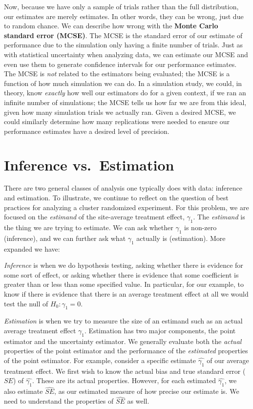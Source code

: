 \documentclass[
]{book}
\begin{document}
Now, because we have only a sample of trials rather than the full distribution, our estimates are merely estimates.
In other words, they can be wrong, just due to random chance.
We can describe how wrong with the \textbf{Monte Carlo standard error (MCSE)}.
The MCSE is the standard error of our estimate of performance due to the simulation only having a finite number of trials.
Just as with statistical uncertainty when analyzing data, we can estimate our MCSE and even use them to generate confidence intervals for our performance estimates.
The MCSE is \emph{not} related to the estimators being evaluated; the MCSE is a function of how much simulation we can do.
In a simulation study, we could, in theory, know \emph{exactly} how well our estimators do for a given context, if we ran an infinite number of simulations; the MCSE tells us how far we are from this ideal, given how many simulation trials we actually ran.
Given a desired MCSE, we could similarly determine how many replications were needed to ensure our performance estimates have a desired level of precision.

\section{Inference vs.~Estimation}\label{inference-vs.-estimation}

There are two general classes of analysis one typically does with data: inference and estimation.
To illustrate, we continue to reflect on the question of best practices for analyzing a cluster randomized experiment.
For this problem, we are focused on the \emph{estimand} of the site-average treatment effect, \(\gamma_1\).
The \emph{estimand} is the thing we are trying to estimate.
We can ask whether \(\gamma_1\) is non-zero (inference), and we can further ask what \(\gamma_1\) actually is (estimation).
More expanded we have:

\emph{Inference} is when we do hypothesis testing, asking whether there is evidence for some sort of effect, or asking whether there is evidence that some coefficient is greater than or less than some specified value.
In particular, for our example, to know if there is evidence that there is an average treatment effect at all we would test the null of \(H_0: \gamma_1 = 0\).

\emph{Estimation} is when we try to measure the size of an estimand such as an actual average treatment effect \(\gamma_1\).
Estimation has two major components, the point estimator and the uncertainty estimator.
We generally evaluate both the \emph{actual} properties of the point estimator and the performance of the \emph{estimated} properties of the point estimator.
For example, consider a specific estimate \(\hat{\gamma_1}\) of our average treatment effect.
We first wish to know the actual bias and true standard error (\(SE\)) of \(\hat{\gamma_1}\).
These are its actual properties.
However, for each estimated \(\hat{\gamma_1}\), we also estimate \(\widehat{SE}\), as our estimated measure of how precise our estimate is.
We need to understand the properties of \(\widehat{SE}\) as well.
\end{document}

